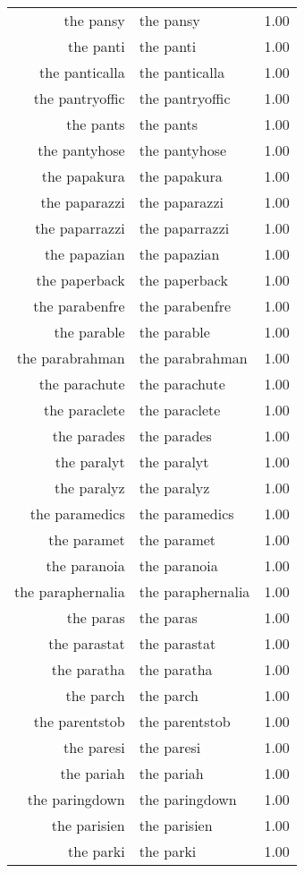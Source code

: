\begin{table}[ht]
\begin{tabular}{rlr}
  the pansy & the pansy & 1.00 \\ 
  the panti & the panti & 1.00 \\ 
  the panticalla & the panticalla & 1.00 \\ 
  the pantryoffic & the pantryoffic & 1.00 \\ 
  the pants & the pants & 1.00 \\ 
  the pantyhose & the pantyhose & 1.00 \\ 
  the papakura & the papakura & 1.00 \\ 
  the paparazzi & the paparazzi & 1.00 \\ 
  the paparrazzi & the paparrazzi & 1.00 \\ 
  the papazian & the papazian & 1.00 \\ 
  the paperback & the paperback & 1.00 \\ 
  the parabenfre & the parabenfre & 1.00 \\ 
  the parable & the parable & 1.00 \\ 
  the parabrahman & the parabrahman & 1.00 \\ 
  the parachute & the parachute & 1.00 \\ 
  the paraclete & the paraclete & 1.00 \\ 
  the parades & the parades & 1.00 \\ 
  the paralyt & the paralyt & 1.00 \\ 
  the paralyz & the paralyz & 1.00 \\ 
  the paramedics & the paramedics & 1.00 \\ 
  the paramet & the paramet & 1.00 \\ 
  the paranoia & the paranoia & 1.00 \\ 
  the paraphernalia & the paraphernalia & 1.00 \\ 
  the paras & the paras & 1.00 \\ 
  the parastat & the parastat & 1.00 \\ 
  the paratha & the paratha & 1.00 \\ 
  the parch & the parch & 1.00 \\ 
  the parentstob & the parentstob & 1.00 \\ 
  the paresi & the paresi & 1.00 \\ 
  the pariah & the pariah & 1.00 \\ 
  the paringdown & the paringdown & 1.00 \\ 
  the parisien & the parisien & 1.00 \\ 
  the parki & the parki & 1.00 \\ 

\end{tabular}
\end{table}
